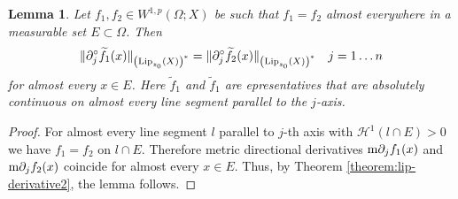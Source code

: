 \documentclass[reqno]{amsart}
\newtheorem{lem}[thm]{Lemma}
\begin{document}
\begin{lem}\label{lemma:der-same}
Let $f_1,f_2 \in W^{1,p}(\Omega; X)$ be
such that $f_1=f_2$ almost everywhere in a measurable set $E\subset\Omega$.
Then
\[
\|\partial^\circ_j \widetilde f_1(x)\|_{\left(\textnormal{Lip}_{z_0}(X)\right)^*} = \|\partial^\circ_j \widetilde f_2(x)\|_{\left(\textnormal{Lip}_{z_0}(X)\right)^*} \quad j=1\dots n
\]
for almost every $x\in E$. Here $\widetilde f_1$ and $\widetilde f_1$  are epresentatives that are absolutely continuous on almost every line segment parallel to the $j$-axis.
\end{lem}
\begin{proof}
For almost every line segment $l$ parallel to $j$-th axis with $\mathcal{H}^1(l\cap E) > 0$ we have $f_1=f_2$ on $l\cap E$.
Therefore metric directional derivatives $\textnormal{m}\partial_j f_1(x)$ and $\textnormal{m}\partial_j f_2(x)$ coincide for almost every $x\in E$.
Thus, by Theorem \ref{theorem:lip-derivative2}, the lemma follows.
\end{proof}
\end{document}
